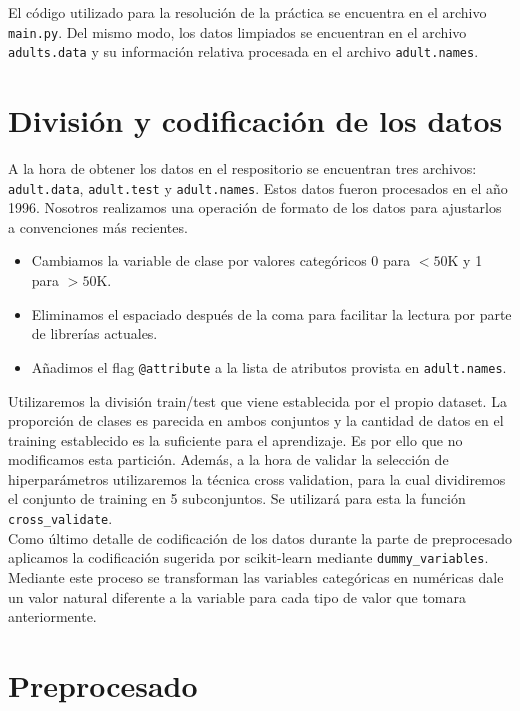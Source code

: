 \documentclass[11pt,a4paper]{article}
\begin{document}
El código utilizado para la resolución de la práctica se encuentra en el archivo \texttt{main.py}.  Del mismo modo, los datos limpiados se encuentran en el archivo \texttt{adults.data} y su información relativa procesada en el archivo \texttt{adult.names}.


\section{ División y codificación de los datos}

A la hora de obtener los datos en el respositorio se encuentran tres archivos: \texttt{adult.data},  \texttt{adult.test} y \texttt{adult.names}. Estos datos fueron procesados en el año 1996. Nosotros realizamos una operación de formato de los datos para ajustarlos a convenciones más recientes.

\begin{itemize}
\item Cambiamos la variable de clase por valores categóricos 0 para $<50$K y 1 para $>50$K.
\item Eliminamos el espaciado después de la coma para facilitar la lectura por parte de librerías actuales.
\item Añadimos el flag \texttt{@attribute} a la lista de atributos provista en \texttt{adult.names}.
\end{itemize}

Utilizaremos la división train/test que viene establecida por el propio dataset. La proporción de clases es parecida en ambos conjuntos y la cantidad de datos en el training establecido es la suficiente para el aprendizaje. Es por ello que no modificamos esta partición. Además, a la hora de validar la selección de hiperparámetros utilizaremos la técnica cross validation, para la cual dividiremos el conjunto de training en 5 subconjuntos. Se utilizará para esta la función \texttt{cross\_validate}\cite{cv}.\\

Como último detalle de codificación de los datos durante la parte de preprocesado aplicamos la codificación sugerida por scikit-learn mediante \texttt{dummy\_variables}. Mediante este proceso se transforman las variables categóricas en numéricas dale un valor natural diferente a la variable para cada tipo de valor que tomara anteriormente.

\section{Preprocesado}
\end{document}
